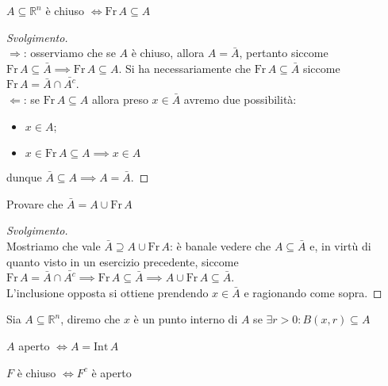 \begin{exercise}
	$A \subseteq \mathbb{R}^n$ è chiuso $\iff \text{Fr} \, A \subseteq A$
\end{exercise}
\begin{proof}[Svolgimento] \hspace{1cm} \\
	$\boxed{\Rightarrow}$: osserviamo che se $A$ è chiuso, allora $A = \bar{A}$, pertanto siccome $\text{Fr} \, A \subseteq \bar{A} \implies \text{Fr} \, A \subseteq A$. Si ha necessariamente che $\text{Fr} \, A \subseteq \bar{A}$ siccome $\text{Fr} \, A = \bar{A} \cap \bar{A^c}$. \\
	$\boxed{\Leftarrow}$: se $\text{Fr} \, A \subseteq A$ allora preso $x \in \bar{A}$ avremo due possibilità:
	\begin{itemize}
		\item $x \in A$;
		\item $x \in \text{Fr} \, A \subseteq A \implies x \in A$
	\end{itemize}
	dunque $\bar{A} \subseteq A \implies A = \bar{A}$.
\end{proof}
\begin{exercise}
	Provare che $\bar{A} = A \cup \text{Fr} \, A$
\end{exercise}
\begin{proof}[Svolgimento] \hspace{1cm} \\
	Mostriamo che vale $\bar{A} \supseteq A \cup \text{Fr} \, A$: è banale vedere che $A \subseteq \bar{A}$ e, in virtù di quanto visto in un esercizio precedente, siccome $\text{Fr} \, A = \bar{A} \cap \bar{A^c} \implies \text{Fr} \, A \subseteq \bar{A} \implies A \cup \text{Fr} \, A \subseteq \bar{A}$. \\
	L'inclusione opposta si ottiene prendendo $x \in \bar{A}$ e ragionando come sopra.
\end{proof}
\begin{definition}
	Sia $A \subseteq \mathbb{R}^n$, diremo che $x$ è un punto interno di $A$ se $\exists r > 0: B(x, r) \subseteq A$
\end{definition}
\begin{remark}
$A$ aperto $\iff A = \text{Int} \, A$
\end{remark}
\begin{prop}
$F$ è chiuso $\iff F^c$ è aperto
\label{prop:set_closed_iff_compl_open}
\end{prop}
